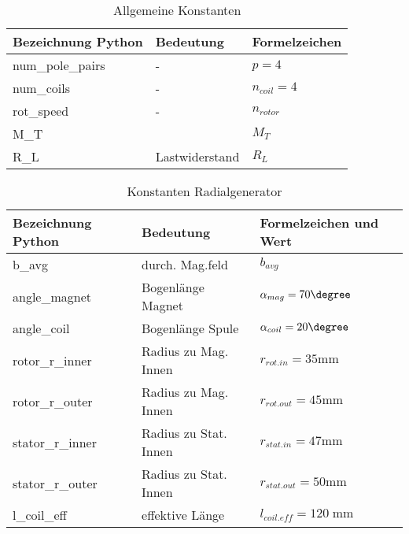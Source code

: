 \begin{table}[h!]

\centering
\caption{Allgemeine Konstanten}
\label{tab:parameter}
\renewcommand{\arraystretch}{2}
\setlength{\tabcolsep}{7mm}

\begin{tabular}{lll}
    \toprule
     Bezeichnung Python & Bedeutung & Formelzeichen\\
    \midrule
	num\_pole\_pairs &-&$p = 4$\\
	num\_coils &-&$n_{coil} = 4$\\
	rot\_speed &-&$n_{rotor}$\\
	M\_T &&$M_{T}$\\
	R\_L &Lastwiderstand&$R_L$\\

    \bottomrule
  \end{tabular}
\end{table}

\newpage


\begin{table}[h!]

\centering
\caption{Konstanten Radialgenerator}
\label{tab:const_rad}
\renewcommand{\arraystretch}{2}
\setlength{\tabcolsep}{5mm}

\begin{tabular}{lll}
    \toprule
     Bezeichnung Python & Bedeutung & Formelzeichen und Wert\\
    \midrule
    b\_avg &durch. Mag.feld &$b_{avg}$\\
	angle\_magnet &Bogenlänge Magnet&$\alpha_ {mag}=70\degree$\\
	angle\_coil &Bogenlänge Spule&$\alpha_{coil} = 20\degree$\\
	rotor\_r\_inner &Radius zu Mag. Innen&$r_{rot.in} = 35 \text{mm}$\\
	rotor\_r\_outer &Radius zu Mag. Innen&$r_{rot.out} = 45 \text{mm}$\\
	stator\_r\_inner &Radius zu Stat. Innen&$r_{stat.in} = 47 \text{mm}$\\
	stator\_r\_outer &Radius zu Stat. Innen&$r_{stat.out} = 50 \text{mm}$\\
  l\_coil\_eff &effektive Länge&$l_{coil.eff} = 120 \; \text{mm} $\\


    \bottomrule
  \end{tabular}
\end{table}

